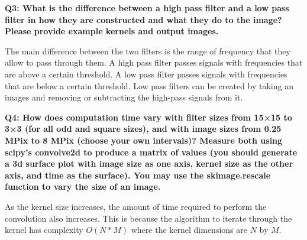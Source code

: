 \documentclass[12pt]{article}
\begin{document}
\textbf{Q3: What is the difference between a high pass filter and a low pass filter in how they
are constructed and what they do to the image? Please provide example kernels and output
images.} 

The main difference between the two filters is the range of frequency that they allow to pass through them.
A high pass filter passes signals with frequencies that are above a certain threshold.
A low pass filter passes signals with frequencies that are below a certain threshold.
Low pass filters can be created by taking an images and removing or subtracting the 
high-pass signals from it.

\textbf{Q4: How does computation time vary with filter sizes from 15×15 to 3×3 (for all odd and
square sizes), and with image sizes from 0.25 MPix to 8 MPix (choose your own intervals)?
Measure both using scipy’s convolve2d to produce a matrix of values (you should
generate a 3d surface plot with image size as one axis, kernel size as the other axis, and
time as the surface). You may use the skimage.rescale function to vary the size of an
image.}

As the kernel size increases, the amount of time required to perform the convolution 
also increases. This is because the algorithm to iterate through the kernel 
has complexity $O(N*M)$ where the kernel dimensions are $N$ by $M$.
\end{document}
